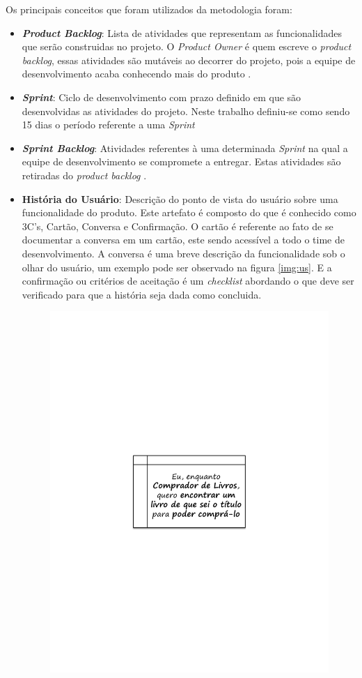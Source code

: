 Os principais conceitos que foram utilizados da metodologia foram:
\begin{itemize}
\item \textit{\textbf{Product Backlog}}: Lista de atividades que representam as funcionalidades que serão construidas no projeto. O \textit{Product Owner} é quem escreve o \textit{product backlog}, essas atividades são mutáveis ao decorrer do projeto, pois a equipe de desenvolvimento acaba conhecendo mais do produto \cite{sabbagh_scrum:_2014}.
\item \textit{\textbf{Sprint}}: Ciclo de desenvolvimento com prazo definido em que são desenvolvidas as atividades do projeto. Neste trabalho definiu-se como sendo 15 dias o período referente a uma \textit{Sprint}
\item \textit{\textbf{Sprint Backlog}}: Atividades referentes à uma determinada \textit{Sprint} na qual a equipe de desenvolvimento se compromete a entregar. Estas atividades são retiradas do \textit{product backlog} \cite{mahnic_case_2011}.
\item \textbf{História do Usuário}: Descrição do ponto de vista do usuário sobre uma funcionalidade do produto. Este artefato é composto do que é conhecido como 3C's, Cartão, Conversa e Confirmação. O cartão é referente ao fato de se documentar a conversa em um cartão, este sendo acessível a todo o time de desenvolvimento. A conversa é uma breve descrição da funcionalidade sob o olhar do usuário, um exemplo pode ser observado na figura \ref{img:us}. E a confirmação ou critérios de aceitação é um \textit{checklist} abordando o que deve ser verificado para que a história seja dada como concluida.
\graphicspath{{figuras/}}
\begin{figure}[h]
\centering
\includegraphics[scale=0.80]{US}

\end{figure}
\end{itemize}
